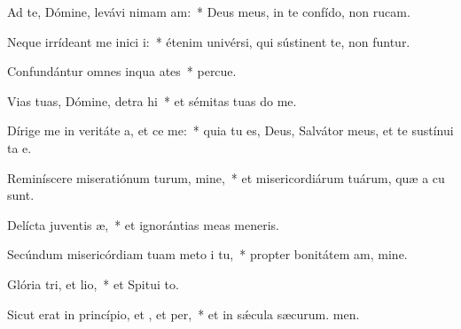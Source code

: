 \item Ad te, Dómine, levávi nimam am:~* Deus meus, in te confído, non rucam.
\item Neque irrídeant me inici i:~* étenim univérsi, qui sústinent te, non funtur.
\item Confundántur omnes inqua ates~* percue.
\item Vias tuas, Dómine, detra hi~* et sémitas tuas do me.
\item Dírige me in veritáte a, et ce me:~* quia tu es, Deus, Salvátor meus, et te sustínui ta e.
\item Reminíscere miseratiónum turum, mine,~* et misericordiárum tuárum, quæ a cu sunt.
\item Delícta juventis æ,~* et ignorántias meas  meneris.
\item Secúndum misericórdiam tuam meto i tu,~* propter bonitátem am, mine.
\item Glória tri, et lio,~* et Spitui to.
\item Sicut erat in princípio, et , et per,~* et in sǽcula sæcurum. men.
